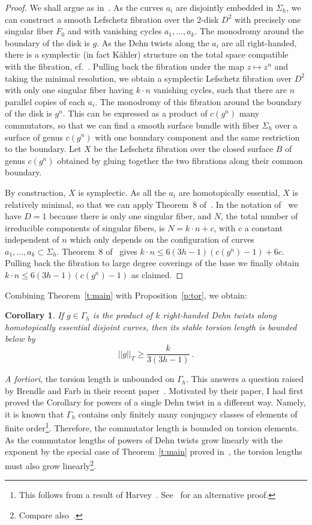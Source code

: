 \documentclass[12pt]{amsart}
\newtheorem{cor}[thm]{Corollary}
\theoremstyle{remark}
\theoremstyle{definition}
\begin{document}
\begin{proof}
We shall argue as in~\cite{BK}.
    As the curves $a_{i}$ are disjointly embedded in $\Sigma_{h}$, we 
    can construct a smooth Lefschetz fibration over the $2$-disk 
    $D^{2}$ with precisely one singular fiber $F_{0}$ and with vanishing 
    cycles $a_{1},\ldots,a_{k}$. The monodromy around the boundary of 
    the disk is $g$. As the Dehn twists along the $a_{i}$ are all 
    right-handed, there is a symplectic (in fact K\"ahler) structure 
    on the total space compatible with the fibration, cf.~\cite{Go}.
    Pulling back the fibration under the map $z \mapsto z^{n}$ 
    and taking the minimal resolution, we obtain a symplectic Lefschetz 
    fibration over $D^{2}$ with only one singular fiber having $k\cdot n$ 
    vanishing cycles, such that there are $n$ parallel copies of each $a_{i}$.
    The monodromy of this fibration around the boundary of the disk is 
    $g^{n}$. This can be expressed as a product of $c(g^{n})$ many commutators, 
    so that we can find a smooth surface bundle with fiber $\Sigma_{h}$ over 
    a surface of genus $c(g^{n})$ with one boundary component and the same 
    restriction to the boundary. Let $X$ be the Lefschetz fibration over 
    the closed surface $B$ of genus $c(g^{n})$ obtained by gluing together
    the two fibrations along their common boundary. 

By construction, $X$ is symplectic. As all the $a_{i}$ are 
homotopically essential, $X$ is relatively minimal, so that we 
can apply Theorem~8 of~\cite{BK}. In the notation of~\cite{BK} we 
have $D=1$ because there is only one singular fiber, and $N$, the 
total number of irreducible components of singular fibers, is $N=k\cdot 
n + c$, with $c$ a constant independent of $n$ which only depends on 
the configuration of curves $a_{1},\ldots,a_{k}\subset\Sigma_{h}$. 
Theorem~8 of~\cite{BK}
gives $k\cdot n\leq 6(3h-1)(c(g^{n})-1) +6c$. Pulling back the 
fibration to large degree coverings of the base we finally obtain 
$k\cdot n\leq 6(3h-1)(c(g^{n})-1)$ as claimed.
\end{proof}
Combining Theorem~\ref{t:main} with Proposition~\ref{p:tor}, we obtain:
\begin{cor}\label{c:Dehn}
    If $g\in\Gamma_{h}$ is the product of $k$ right-handed Dehn twists 
    along homotopically essential disjoint curves, then its stable torsion 
    length is bounded below by 
    $$
    \vert\vert g\vert\vert_{T}\geq\frac{k}{3(3h-1)} \ .
    $$
    \end{cor}
{\it A fortiori}, the torsion length is unbounded on $\Gamma_{h}$.
This answers a question raised by Brendle and Farb in their recent 
paper~\cite{BrFa}. Motivated by their paper, I had first proved the Corollary 
for powers of a single Dehn twist in a different way. Namely, it is known that 
$\Gamma_{h}$ contains only finitely many conjugacy classes of elements of 
finite 
order\footnote{This follows from a result of Harvey~\cite{H}. See~\cite{K} 
for an alternative proof.}. Therefore, the commutator length is bounded on 
torsion elements. As the commutator lengths of powers of Dehn twists grow 
linearly with the exponent by the special case of 
Theorem~\ref{t:main} proved in~\cite{EK}, the torsion lengths must also grow 
linearly\footnote{Compare also~\cite{Kork2}.}.
\end{document}
